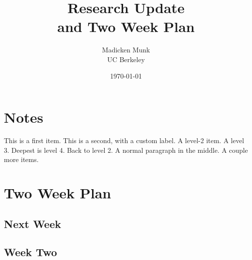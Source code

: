 \documentclass{report}
\begin{document}
\title{Research Update \\
         and Two Week Plan}
\author{Madicken Munk\\
          UC Berkeley}
\date{\today}
\setcounter{secnumdepth}{0}
\section{Notes}
\begin{outline}
 \1 This is a first item.
  \1[!!!] This is a second, with a custom label.
    \2 A level-2 item.
      \3 A level 3.
        \4 Deepest is level 4.
    \2 Back to level 2.
\0 A normal paragraph in the middle.
  \1 A couple more
    \2 items.
\end{outline}
\section{Two Week Plan}
\subsection{Next Week}
\subsection{Week Two}
\end{document}

